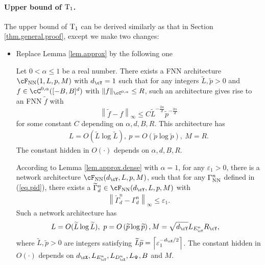 \documentclass[11pt]{article} %
\begin{document}
\paragraph{Upper bound of ${\rm T_1}$.} The upper bound of ${\rm T}_1$ can be derived similarly as that in Section \ref{thm.general.proof}, except we make two changes:
\begin{itemize}
	\item Replace Lemma \ref{lem.approx} by the following one
	\begin{lemma}\label{lem.approx.dense}
		Let $0<\alpha\leq 1$ be a real number. There exists a FNN architecture $\cF_{\rm NN}(1,L,p,M)$ with $d_{\cY}=1$ such that for any integers $\widetilde{L},\widetilde{p}>0$ and $f\in \cC^{0,\alpha}([-B,B]^d)$ with $\|f\|_{\cC^{0,\alpha}}\leq R$, such an architecture gives rise to an FNN $\widetilde{f}$ with
		$$
		\left\|\widetilde{f}-f\right\|_{\infty}\leq C\widetilde{L}^{-\frac{2\alpha}{d}}\widetilde{p}^{-\frac{2\alpha}{d}}
		$$
		for some constant $C$ depending on $\alpha,d,B,R$. 
		This architecture has
		\begin{align*}
			L=O(\widetilde{L}\log \widetilde{L}), \ p=O\left(\widetilde{p}\log \widetilde{p}\right),\ M=R.
		\end{align*}
		The constant hidden in $O(\cdot)$ depends on $\alpha,d,B,R$.
	\end{lemma}
	
	According to Lemma \ref{lem.approx.dense} with $\alpha=1$, for any $\varepsilon_1>0$, there is a network architecture $\cF_{\rm NN}(d_{\cY},L,p,M)$, such that for any  $\Gamma_{\rm NN}^n$ defined in (\ref{eq.pid}), there exists a $\widetilde{\Gamma}_d^n\in \cF_{\rm NN}(d_{\cY},L,p,M)$ with
	\begin{align*}
		\left\|\widetilde{\Gamma}_d^n-\Gamma_d^n\right\|_{\infty}\leq \varepsilon_1.
	\end{align*}
	Such a network architecture has
	\begin{equation}
		\begin{aligned}
			&L=O(\widetilde{L}\log \widetilde{L}), \ p=O\left(\widetilde{p}\log \widetilde{p}\right), M=\sqrt{d_{\cY}}L_{E^n_{\cY}}R_{\cY},
		\end{aligned}\label{eq.NN.parameter.dense}
	\end{equation}
	where $\widetilde{L},\widetilde{p}>0$ are integers satisfying $ \widetilde{L}\widetilde{p}=\left\lceil \varepsilon_1^{-d_{\cX}/2}\right\rceil$. The constant hidden in $O(\cdot)$ depends on $d_{\cX},L_{E^n_{\cY}},L_{D^n_{\cX}},L_{\Psi},B$ and $M$.
	

\end{itemize}
\end{document}
